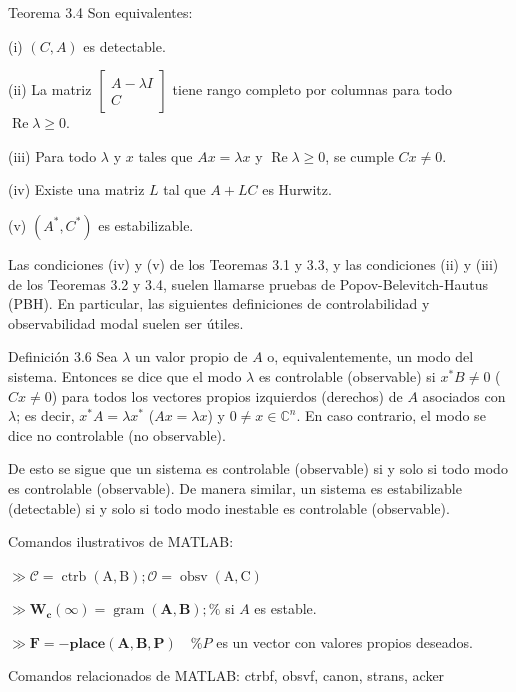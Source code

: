 \documentclass[11pt]{article}
\begin{document}
Teorema 3.4 Son equivalentes:

(i) $(C, A)$ es detectable.

(ii) La matriz $\left[\begin{array}{c}A-\lambda I \\ C\end{array}\right]$ tiene rango completo por columnas para todo $\operatorname{Re} \lambda \geq 0$.

(iii) Para todo $\lambda$ y $x$ tales que $A x=\lambda x$ y $\operatorname{Re} \lambda \geq 0$, se cumple $C x \neq 0$.

(iv) Existe una matriz $L$ tal que $A+L C$ es Hurwitz.

(v) $\left(A^{*}, C^{*}\right)$ es estabilizable.

Las condiciones (iv) y (v) de los Teoremas 3.1 y 3.3, y las condiciones (ii) y (iii) de los Teoremas 3.2 y 3.4, suelen llamarse pruebas de Popov-Belevitch-Hautus (PBH). En particular, las siguientes definiciones de controlabilidad y observabilidad modal suelen ser útiles.

Definición 3.6 Sea $\lambda$ un valor propio de $A$ o, equivalentemente, un modo del sistema. Entonces se dice que el modo $\lambda$ es controlable (observable) si $x^{*} B \neq 0$ ($C x \neq 0$) para todos los vectores propios izquierdos (derechos) de $A$ asociados con $\lambda$; es decir, $x^{*} A=\lambda x^{*}$ ($A x=\lambda x$) y $0 \neq x \in \mathbb{C}^{n}$. En caso contrario, el modo se dice no controlable (no observable).

De esto se sigue que un sistema es controlable (observable) si y solo si todo modo es controlable (observable). De manera similar, un sistema es estabilizable (detectable) si y solo si todo modo inestable es controlable (observable).

Comandos ilustrativos de MATLAB:

$\gg \mathcal{C}=\operatorname{ctrb}(\mathrm{A}, \mathrm{B}) ; \mathcal{O}=\operatorname{obsv}(\mathrm{A}, \mathrm{C})$

$\gg \mathbf{W}_{\mathbf{c}}(\infty)=\operatorname{gram}(\mathbf{A}, \mathbf{B}) ; \%$ si $A$ es estable.

$\gg \mathbf{F}=-\mathbf{p l a c e}(\mathbf{A}, \mathbf{B}, \mathbf{P}) \quad \% P$ es un vector con valores propios deseados.

Comandos relacionados de MATLAB: ctrbf, obsvf, canon, strans, acker
\end{document}
